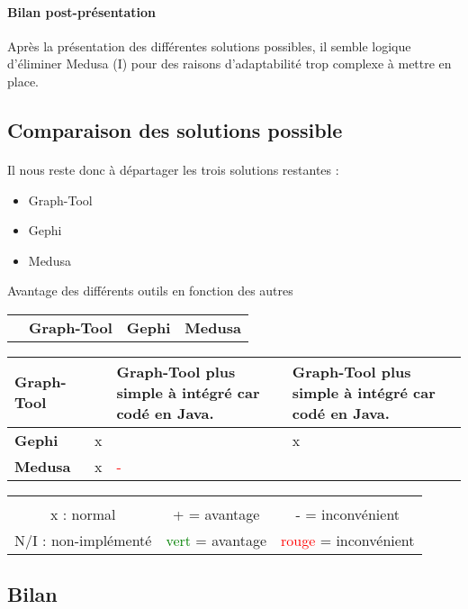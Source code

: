   \paragraph{Bilan post-présentation}
  Après la présentation des différentes solutions possibles, il semble logique d'éliminer  Medusa (I) pour des raisons d'adaptabilité trop complexe à mettre en place.
  
  \subsection{Comparaison des solutions possible}
  
  \paragraph{}
  Il nous reste donc à départager les trois solutions restantes : 
  \begin{itemize}
  	\item Graph-Tool
  	\item Gephi
  	\item Medusa
  \end{itemize}

    
    \begin{table}[!h]{Avantage des différents outils en fonction des autres}
      
      \centering
    
    \begin{tabular}{p{3.5cm}  p{3.50cm}  p{3.5cm}  p{3.50cm} }

	& \textbf{Graph-Tool} 		& \textbf{Gephi} 	& \textbf{Medusa}	\\ 
    	
    \end{tabular}

    
    \begin{tabular}{|p{3.5cm} | p{3.50cm} | p{3.5cm} | p{3.50cm} |}
      
      \hline
      \textbf{Graph-Tool} 	& & Graph-Tool plus simple à intégré car codé en Java. 	
				  & Graph-Tool plus simple à intégré car codé en Java. 	\\ \hline
      \textbf{Gephi} 		& x 				
			      & & x 			\\ \hline
      \textbf{Medusa} 		& x 				
				& \textcolor{red}{-} 	
				& \\ \hline
    \end{tabular}
    
    \begin{tabular}{c c c}
    &&\\
    x : normal & + = avantage & - = inconvénient\\
    N/I : non-implémenté & \textcolor{green}{vert} = avantage & \textcolor{red}{rouge} = inconvénient\\
    \end{tabular}

  \end{table}
  
  
  \subsection{Bilan}
  
  
